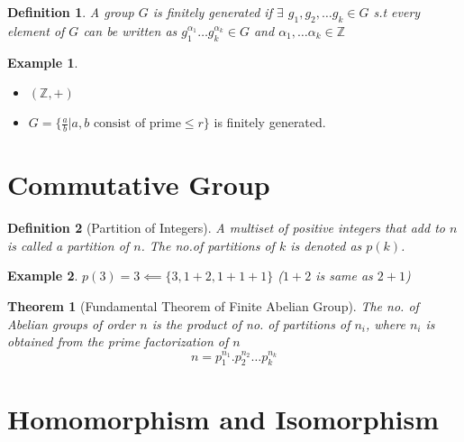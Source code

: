\documentclass[12pt,a4paper]{article}
\newcommand{\Z}{\mathbb{Z}}
\newtheorem{thm}{Theorem}
\newtheorem*{defn}{Definition}
\newtheorem{ex}{Example}
\begin{document}
\begin{defn}
	A group $G$ is finitely generated if $\exists$ $g_{1},g_{2},\dots g_{k}\in G$ s.t every element of $G$ can be written as $g_{1}^{{\alpha}_{1}} \dots g_{k}^{{\alpha}_{k}} \in G  $ and $\alpha_{1}, \dots \alpha_{k} \in \Z$
\end{defn}
\begin{ex}
\end{ex}	
\begin{itemize}
	\item $(\Z, +)$
	\item $G = \{\frac{a}{b} | a,b \text{ consist of prime} \le r\}$ is finitely generated.
\end{itemize}



\section{Commutative Group}
\begin{defn}[Partition of Integers]
	A multiset of positive integers that add to $n$ is called a partition of $n$. The no.of partitions of $k$ is denoted as $p(k)$.
\end{defn}
\begin{ex}
	$p(3) = 3 \impliedby \{3,1+2,1+1+1\}$ ($1+2$ is same as $2+1$)
\end{ex}
\begin{thm}[Fundamental Theorem of Finite Abelian Group]
	The no. of Abelian groups of order $n$ is the product of no. of partitions of $n_{i}$, where $n_{i}$ is obtained from the prime factorization of $n$ 
	$$
		n = p_{1}^{{n}_{1}}. p_{2}^{{n}_{2}}\dots p_{k}^{{n}_{k}}
	$$
\end{thm}

\section{Homomorphism and Isomorphism}
\end{document}
